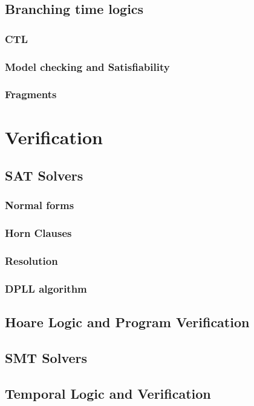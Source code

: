 \chapter{Branching time logics}
\section{CTL}
\section{Model checking and Satisfiability}
\section{Fragments}

\part{Verification}

\chapter{SAT Solvers}
\section{Normal forms}
\section{Horn Clauses}
\section{Resolution}
\section{DPLL algorithm}

\chapter{Hoare Logic and Program Verification}
\chapter{SMT Solvers}

\chapter{Temporal Logic and Verification}
